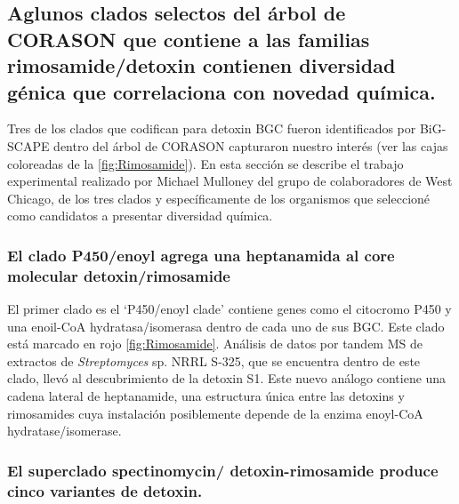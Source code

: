 \documentclass[12pt,twoside]{reedthesis}
\begin{document}
  \subsection{Aglunos clados selectos del árbol de CORASON que contiene a
  las familias rimosamide/detoxin contienen diversidad génica que
  correlaciona con novedad
  química.}\label{aglunos-clados-selectos-del-arbol-de-corason-que-contiene-a-las-familias-rimosamidedetoxin-contienen-diversidad-genica-que-correlaciona-con-novedad-quimica.}
  
  Tres de los clados que codifican para detoxin BGC fueron identificados
  por BiG-SCAPE dentro del árbol de CORASON capturaron nuestro interés
  (ver las cajas coloreadas de la \autoref{fig:Rimosamide}). En esta
  sección se describe el trabajo experimental realizado por Michael
  Mulloney del grupo de colaboradores de West Chicago, de los tres clados
  y específicamente de los organismos que seleccioné como candidatos a
  presentar diversidad química.
  
  \subsubsection{El clado P450/enoyl agrega una heptanamida al core
  molecular
  detoxin/rimosamide}\label{el-clado-p450enoyl-agrega-una-heptanamida-al-core-molecular-detoxinrimosamide}
  
  El primer clado es el `P450/enoyl clade' contiene genes como el
  citocromo P450 y una enoil-CoA hydratasa/isomerasa dentro de cada uno de
  sus BGC. Este clado está marcado en rojo \autoref{fig:Rimosamide}.
  Análisis de datos por tandem MS de extractos de \emph{Streptomyces} sp.
  NRRL S-325, que se encuentra dentro de este clado, llevó al
  descubrimiento de la detoxin S1. Este nuevo análogo contiene una cadena
  lateral de heptanamide, una estructura única entre las detoxins y
  rimosamides cuya instalación posiblemente depende de la enzima enoyl-CoA
  hydratase/isomerase.
  
  \subsubsection{El superclado spectinomycin/ detoxin-rimosamide produce
  cinco variantes de
  detoxin.}\label{el-superclado-spectinomycin-detoxin-rimosamide-produce-cinco-variantes-de-detoxin.}
  
\end{document}
